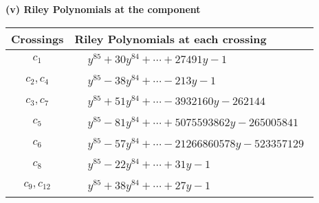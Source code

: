 \documentclass[1p]{elsarticle_modified}
\theoremstyle{definition}
\begin{document}
\newpage\renewcommand{\arraystretch}{1}
\flushleft \textbf{(v) Riley Polynomials at the component}\newline \\
\begin{tabular}{m{50pt}|m{274pt}}
Crossings & \hspace{64pt}Riley Polynomials at each crossing \\
\hline $$\begin{aligned}c_{1}\end{aligned}$$&$\begin{aligned}
&y^{85}+30 y^{84}+\cdots+27491 y-1
\end{aligned}$\\
\hline $$\begin{aligned}c_{2},c_{4}\end{aligned}$$&$\begin{aligned}
&y^{85}-38 y^{84}+\cdots-213 y-1
\end{aligned}$\\
\hline $$\begin{aligned}c_{3},c_{7}\end{aligned}$$&$\begin{aligned}
&y^{85}+51 y^{84}+\cdots-3932160 y-262144
\end{aligned}$\\
\hline $$\begin{aligned}c_{5}\end{aligned}$$&$\begin{aligned}
&y^{85}-81 y^{84}+\cdots+5075593862 y-265005841
\end{aligned}$\\
\hline $$\begin{aligned}c_{6}\end{aligned}$$&$\begin{aligned}
&y^{85}-57 y^{84}+\cdots-21266860578 y-523357129
\end{aligned}$\\
\hline $$\begin{aligned}c_{8}\end{aligned}$$&$\begin{aligned}
&y^{85}-22 y^{84}+\cdots+31 y-1
\end{aligned}$\\
\hline $$\begin{aligned}c_{9},c_{12}\end{aligned}$$&$\begin{aligned}
&y^{85}+38 y^{84}+\cdots+27 y-1
\end{aligned}$\\

\end{tabular}
\end{document}
